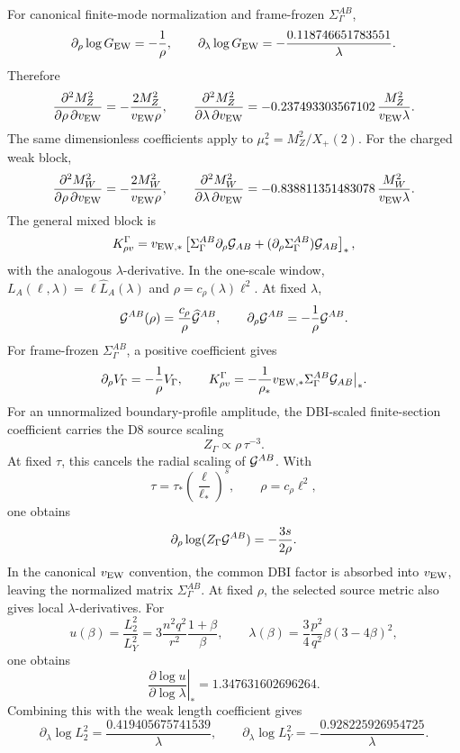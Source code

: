 \documentclass[11pt]{article}
\theoremstyle{definition}
\theoremstyle{remark}
\newcommand{\Xp}{X_+}
\begin{document}
For canonical finite-mode normalization and frame-frozen
\(\Sigma_\Gamma^{AB}\),
\[
  \partial_\rho\log G_{\rm EW}=-\frac1\rho,
  \qquad
  \partial_\lambda\log G_{\rm EW}
  =
  -\frac{0.118746651783551}{\lambda}.
\]
Therefore
\[
  \frac{\partial^2M_Z^2}{\partial\rho\,\partial v_{\rm EW}}
  =
  -\frac{2M_Z^2}{v_{\rm EW}\rho},
  \qquad
  \frac{\partial^2M_Z^2}{\partial\lambda\,\partial v_{\rm EW}}
  =
  -0.237493303567102\,
  \frac{M_Z^2}{v_{\rm EW}\lambda}.
\]
The same dimensionless coefficients apply to
\(\mu_*^2=M_Z^2/\Xp(2)\).
For the charged weak block,
\[
  \frac{\partial^2M_W^2}{\partial\rho\,\partial v_{\rm EW}}
  =
  -\frac{2M_W^2}{v_{\rm EW}\rho},
  \qquad
  \frac{\partial^2M_W^2}{\partial\lambda\,\partial v_{\rm EW}}
  =
  -0.838811351483078\,
  \frac{M_W^2}{v_{\rm EW}\lambda}.
\]
The general mixed block is
\[
  K_{\rho v}^{\Gamma}
  =
  v_{\rm EW,*}
  \left[
  \Sigma_\Gamma^{AB}\partial_\rho{\cal G}_{AB}
  +(\partial_\rho\Sigma_\Gamma^{AB}){\cal G}_{AB}
  \right]_*,
\]
with the analogous \(\lambda\)-derivative.
In the one-scale window, \(L_A(\ell,\lambda)=\ell\widehat L_A(\lambda)\)
and \(\rho=c_\rho(\lambda)\ell^2\).  At fixed \(\lambda\),
\[
  {\cal G}^{AB}(\rho)
  =
  \frac{c_\rho}{\rho}\widehat{\cal G}^{AB},
  \qquad
  \partial_\rho{\cal G}^{AB}
  =
  -\frac{1}{\rho}{\cal G}^{AB}.
\]
For frame-frozen \(\Sigma_\Gamma^{AB}\), a positive coefficient gives
\[
  \partial_\rho V_\Gamma=-\frac{1}{\rho}V_\Gamma,
  \qquad
  K_{\rho v}^{\Gamma}
  =
  -\frac{1}{\rho_*}
  v_{\rm EW,*}\Sigma_\Gamma^{AB}{\cal G}_{AB}\big|_* .
\]
For an unnormalized boundary-profile amplitude, the DBI-scaled finite-section
coefficient carries the D8 source scaling
\[
  Z_\Gamma\propto\rho\,\tau^{-3}.
\]
At fixed \(\tau\), this cancels the radial scaling of
\({\cal G}^{AB}\).  With
\[
  \tau=\tau_*\left(\frac{\ell}{\ell_*}\right)^s,
  \qquad
  \rho=c_\rho\ell^2,
\]
one obtains
\[
  \partial_\rho\log(Z_\Gamma{\cal G}^{AB})
  =
  -\frac{3s}{2\rho}.
\]
In the canonical \(v_{\rm EW}\) convention, the common DBI factor is absorbed
into \(v_{\rm EW}\), leaving the normalized matrix \(\Sigma_\Gamma^{AB}\).
At fixed \(\rho\), the selected source metric also gives local
\(\lambda\)-derivatives.  For
\[
  u(\beta)=\frac{L_2^2}{L_Y^2}
  =
  3\frac{n^2q^2}{r^2}\frac{1+\beta}{\beta},
  \qquad
  \lambda(\beta)
  =
  \frac34\frac{p^2}{q^2}\beta(3-4\beta)^2 ,
\]
one obtains
\[
  \left.\frac{\partial\log u}{\partial\log\lambda}\right|_*
  =
  1.347631602696264 .
\]
Combining this with the weak length coefficient gives
\[
  \partial_\lambda\log L_2^2
  =
  \frac{0.419405675741539}{\lambda},
  \qquad
  \partial_\lambda\log L_Y^2
  =
  -\frac{0.928225926954725}{\lambda}.
\]
\end{document}
